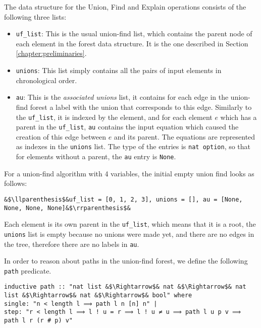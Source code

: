 The data structure for the Union, Find and Explain operations consists of the following three lists:

\begin{itemize}
	\item \lstinline{uf_list}: This is the usual union-find list, which contains the parent node of each element in the forest data structure. It is the one described in Section \ref{chapter:preliminaries}.

	\item \lstinline{unions}: This list simply contains all the pairs of input elements in chronological order.

	\item \lstinline{au}: This is the \emph{associated unions} list, it contains for each edge in the union-find forest a label with the union that corresponds to this edge. Similarly to the \lstinline{uf_list}, it is indexed by the element, and for each element $e$ which has a parent in the \lstinline{uf_list}, \lstinline{au} contains the input equation which caused the creation of this edge between $e$ and its parent. The equations are represented as indexes in the \lstinline{unions} list. The type of the entries is \lstinline{nat option}, so that for elements without a parent, the \lstinline{au} entry is \lstinline{None}.
\end{itemize}

\begin{exmp}\label{empty_ufe}
For a union-find algorithm with 4 variables, the initial empty union find looks as follows:
\begin{lstlisting}
&$\llparenthesis$&uf_list = [0, 1, 2, 3], unions = [], au = [None, None, None, None]&$\rrparenthesis$&
\end{lstlisting}
Each element is its own parent in the \lstinline{uf_list}, which means that it is a root, the \lstinline{unions} list is empty because no unions were made yet, and there are no edges in the tree, therefore there are no labels in \lstinline{au}.
\end{exmp}

In order to reason about paths in the union-find forest, we define the following \lstinline{path} predicate.

\begin{lstlisting}
inductive path :: "nat list &$\Rightarrow$& nat &$\Rightarrow$& nat list &$\Rightarrow$& nat &$\Rightarrow$& bool" where
single: "n < length l ⟹ path l n [n] n" |
step: "r < length l ⟹ l ! u = r ⟹ l ! u ≠ u ⟹ path l u p v ⟹ path l r (r # p) v"
\end{lstlisting}

